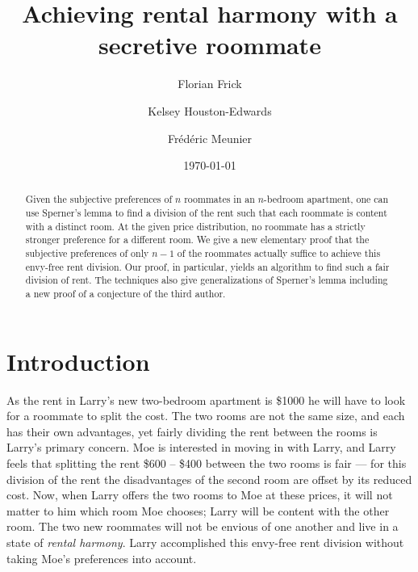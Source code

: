 \documentclass[a4paper,10pt,reqno, english]{amsart}
\theoremstyle{plain}
\theoremstyle{definition}
\begin{document}

\title{Achieving rental harmony with a secretive roommate}





\author{Florian Frick \and Kelsey Houston-Edwards \and Fr\'ed\'eric Meunier}

\address[FF, KHE]{Department of Mathematics, Cornell University, Ithaca, NY 14853, USA}

\address[FM]{Universit\'e Paris Est, CERMICS, 77455 Marne-la-Vall\'ee CEDEX, France}


\date{\today}
\maketitle





\begin{abstract}
\small
Given the subjective preferences of $n$ roommates in an $n$-bedroom apartment, one can use Sperner's lemma to find a division of the rent such that each roommate is content with a distinct room. At the given price distribution, no roommate has a strictly stronger preference for a different room. We give a new elementary proof that the subjective preferences of only $n-1$ of the roommates actually suffice to achieve this envy-free rent division. Our proof, in particular, yields an algorithm to find such a fair division of rent. The techniques also give generalizations of Sperner's lemma including a new proof of a conjecture of the third author.
\end{abstract}


\section{Introduction}

As the rent in Larry's new two-bedroom apartment is \$1000 he will have to look for a roommate to split the cost.
The two rooms are not the same size, and each has their own advantages, yet fairly dividing the rent between
the rooms is Larry's primary concern. Moe is interested in moving in with Larry, and Larry feels that splitting the rent
\$600 -- \$400 between the two rooms is fair --- for this division of the rent the disadvantages of the second room
are offset by its reduced cost. Now, when Larry offers the two rooms to Moe at these prices, it will not matter to
him which room Moe chooses; Larry will be content with the other room. The two new roommates will not be envious
of one another and live in a state of \emph{rental harmony}. Larry accomplished this envy-free rent division without 
taking Moe's preferences into account.
\end{document}
